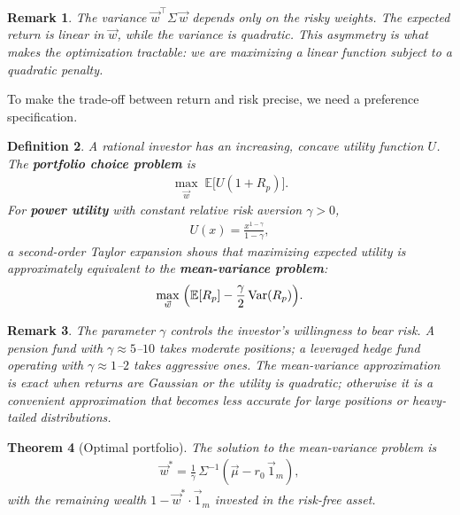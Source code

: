 \documentclass{report}
\theoremstyle{spacedplain}
\newtheorem{theorem}{Theorem}[section]
\theoremstyle{spaceddefinition}
\newtheorem{definition}[theorem]{Definition}
\theoremstyle{spacedremark}
\newtheorem{remark}[theorem]{Remark}
\begin{document}
\begin{remark}
The variance $\vec{w}^\top \Sigma\, \vec{w}$ depends only on the risky weights. The expected return is linear in $\vec{w}$, while the variance is quadratic. This asymmetry is what makes the optimization tractable: we are maximizing a linear function subject to a quadratic penalty.
\end{remark}

To make the trade-off between return and risk precise, we need a preference specification.

\begin{definition}
A rational investor has an increasing, concave utility function $U$. The \textbf{portfolio choice problem} is
\begin{align}
    \max_{\vec{w}}\;\mathbb{E}\bigl[U(1 + R_p)\bigr].
\end{align}
For \textbf{power utility} with constant relative risk aversion $\gamma > 0$,
\begin{align}
    U(x) = \frac{x^{1-\gamma}}{1-\gamma},
\end{align}
a second-order Taylor expansion shows that maximizing expected utility is approximately equivalent to the \textbf{mean-variance problem}:
\begin{align}
    \max_{\vec{w}}\;\Bigl(\mathbb{E}[R_p] - \frac{\gamma}{2}\,\text{Var}(R_p)\Bigr).
\end{align}
\end{definition}

\begin{remark}
The parameter $\gamma$ controls the investor's willingness to bear risk. A pension fund with $\gamma \approx 5$--$10$ takes moderate positions; a leveraged hedge fund operating with $\gamma \approx 1$--$2$ takes aggressive ones. The mean-variance approximation is exact when returns are Gaussian or the utility is quadratic; otherwise it is a convenient approximation that becomes less accurate for large positions or heavy-tailed distributions.
\end{remark}

\begin{theorem}[Optimal portfolio]
The solution to the mean-variance problem is
\begin{align}
    \vec{w}^* = \frac{1}{\gamma}\,\Sigma^{-1}(\vec{\mu} - r_0\,\vec{1}_m),
\end{align}
with the remaining wealth $1 - \vec{w}^* \cdot \vec{1}_m$ invested in the risk-free asset.
\end{theorem}
\end{document}
